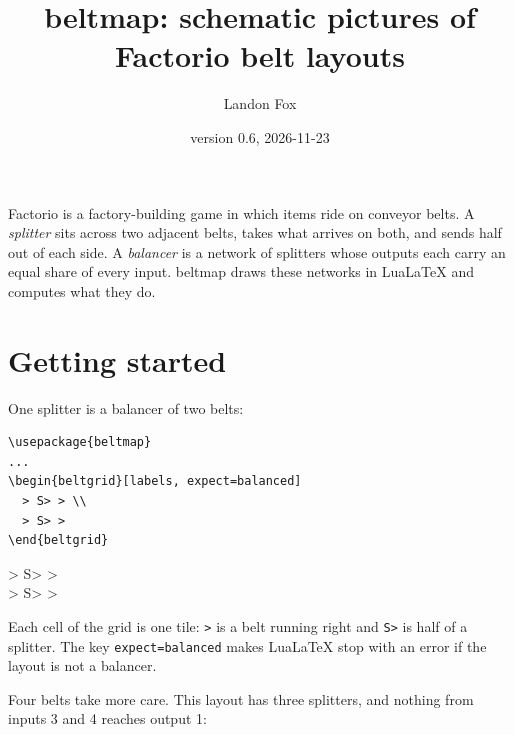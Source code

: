 \documentclass[11pt]{article}
\title{\textsf{beltmap}: schematic pictures of Factorio belt layouts}
\author{Landon Fox}
\date{version 0.6, 2026-11-23}
\newcommand\key[1]{\texttt{#1}}
\begin{document}
	\maketitle

	Factorio is a factory-building game in which items ride on conveyor belts. A \emph{splitter} sits across two adjacent belts, takes what arrives on both, and sends half out of each side. A \emph{balancer} is a network of splitters whose outputs each carry an equal share of every input. \textsf{beltmap} draws these networks in Lua\LaTeX{} and computes what they do.

	\tableofcontents
	\clearpage

	\section{Getting started}

	One splitter is a balancer of two belts:

	\begin{minipage}[c]{0.6\linewidth}
		\begin{Verbatim}
\usepackage{beltmap}
...
\begin{beltgrid}[labels, expect=balanced]
  > S> > \\
  > S> >
\end{beltgrid}
		\end{Verbatim}
	\end{minipage}\hfill
	\begin{minipage}[c]{0.36\linewidth}
		\centering
		\begin{beltgrid}[labels, expect=balanced, tile=6mm]
			> S> > \\
			> S> >
		\end{beltgrid}
	\end{minipage}

	Each cell of the grid is one tile: \verb|>| is a belt running right and \verb|S>| is half of a splitter. The key \key{expect=balanced} makes Lua\LaTeX{} stop with an error if the layout is not a balancer.

	Four belts take more care. This layout has three splitters, and nothing from inputs 3 and 4 reaches output 1:
\end{document}
